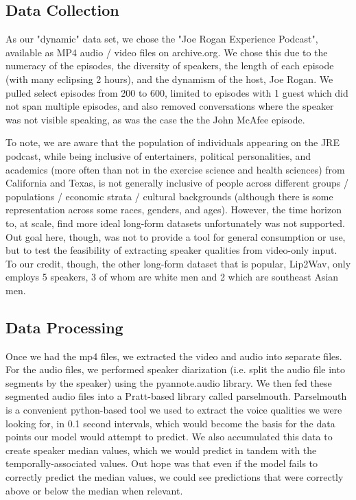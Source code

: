 \documentclass[10pt,twocolumn,letterpaper]{article}
\begin{document}
\subsection{Data Collection}

As our "dynamic" data set, we chose the "Joe Rogan Experience Podcast", available as MP4 audio / video files on archive.org. We chose this due to the numeracy of the episodes, the diversity of speakers, the length of each episode (with many eclipsing 2 hours), and the dynamism of the host, Joe Rogan. We pulled select episodes from 200 to 600, limited to episodes with 1 guest which did not span multiple episodes, and also removed conversations where the speaker was not visible speaking, as was the case the the John McAfee episode. 

To note, we are aware that the population of individuals appearing on the JRE podcast, while being inclusive of entertainers, political personalities, and academics (more often than not in the exercise science and health sciences)  from California and Texas, is not generally inclusive of people across different groups / populations / economic strata / cultural backgrounds (although there is some representation across some races,  genders, and ages). However, the time horizon to, at scale, find more ideal long-form datasets unfortunately was not supported. Out goal here, though, was not to provide a tool for general consumption or use, but to test the feasibility of extracting speaker qualities from video-only input. To our credit, though, the other long-form dataset that is popular, Lip2Wav\cite{LipWavCorpus2020}, only employs 5 speakers, 3 of whom are white men and 2 which are southeast Asian men.

\subsection{Data Processing}

Once we had the mp4 files, we extracted the video and audio into separate files. For the audio files, we performed speaker diarization (i.e. split the audio file into segments by the speaker) using the pyannote.audio library\cite{Bredin23}. We then fed these segmented audio files into a Pratt\cite{Pratt}-based library called parselmouth\cite{Parselmouth}.  Parselmouth is a convenient python-based tool we used to extract the voice qualities we were looking for, in 0.1 second intervals, which would become the basis for the data points our model would attempt to predict. We also accumulated this data to create speaker median values, which we would predict in tandem with the temporally-associated values. Out hope was that even if the model fails to correctly predict the median values, we could see predictions that were correctly above or below the median when relevant. 
\end{document}
